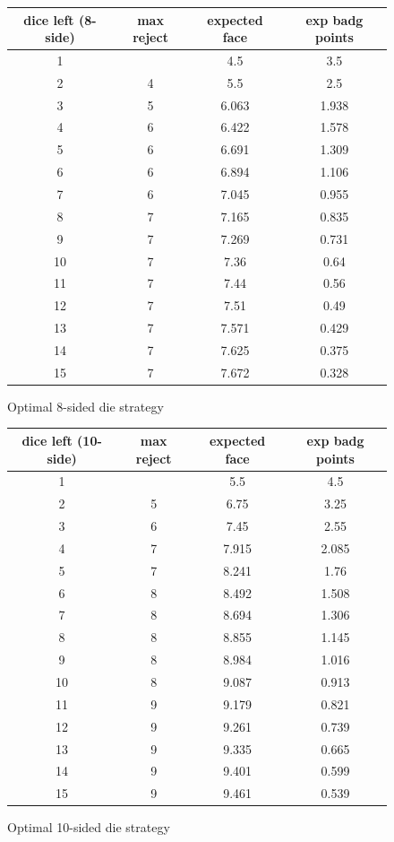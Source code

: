 \documentclass[11pt, oneside]{article} 	%
\begin{document}
\begin{figure}[!htb]
\centering
\begin{tabular}{c | c c c}
dice left (8-side) & max reject & expected face & exp badg points \\
\hline
1 &  & 4.5 & 3.5 \\
2 & \cellcolor{cyan} 4 & 5.5 & 2.5 \\
3 & \cellcolor{cyan} 5 & 6.063 & 1.938 \\
4 & 6 & 6.422 & 1.578 \\
5 & 6 & 6.691 & 1.309 \\
6 & 6 & 6.894 & 1.106 \\
7 & \cellcolor{cyan} 6 & 7.045 & 0.955 \\
8 & 7 & 7.165 & 0.835 \\
9 & 7 & 7.269 & 0.731 \\
10 & 7 & 7.36 & 0.64 \\
11 & 7 & 7.44 & 0.56 \\
12 & 7 & 7.51 & 0.49 \\
13 & 7 & 7.571 & 0.429 \\
14 & 7 & 7.625 & 0.375 \\
15 & 7 & 7.672 & 0.328 \\
\end{tabular}
\caption{Optimal 8-sided die strategy}
\label{fig:optimal8}
\end{figure}


\begin{figure}[!htb]
\centering
\begin{tabular}{c | c c c}
dice left (10-side) & max reject & expected face & exp badg points \\
\hline
1 &  & 5.5 & 4.5 \\
2 & \cellcolor{cyan} 5 & 6.75 & 3.25 \\
3 & \cellcolor{cyan} 6 & 7.45 & 2.55 \\
4 & 7 & 7.915 & 2.085 \\
5 & \cellcolor{cyan} 7 & 8.241 & 1.76 \\
6 & 8 & 8.492 & 1.508 \\
7 & 8 & 8.694 & 1.306 \\
8 & 8 & 8.855 & 1.145 \\
9 & 8 & 8.984 & 1.016 \\
10 & \cellcolor{cyan} 8 & 9.087 & 0.913 \\
11 & 9 & 9.179 & 0.821 \\
12 & 9 & 9.261 & 0.739 \\
13 & 9 & 9.335 & 0.665 \\
14 & 9 & 9.401 & 0.599 \\
15 & 9 & 9.461 & 0.539 \\
\end{tabular}
\caption{Optimal 10-sided die strategy}
\label{fig:optimal10}
\end{figure}
\end{document}
